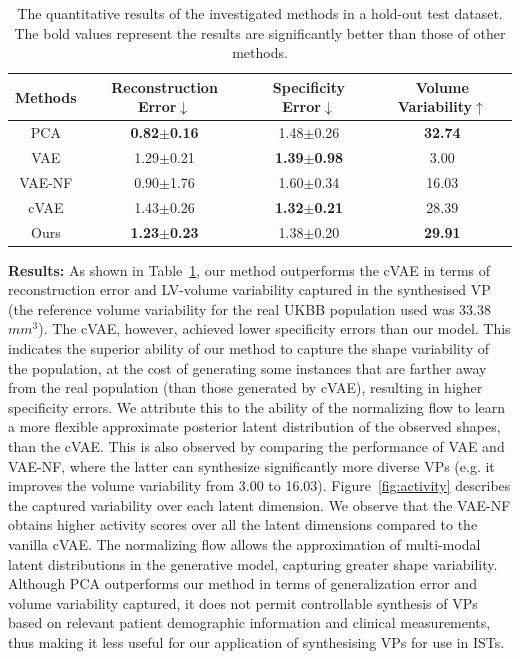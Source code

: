 \documentclass[runningheads]{llncs}
\begin{document}
\begin{table}[ht]
\centering
\caption{The quantitative results of the investigated methods in a hold-out test dataset. The bold values represent the results are significantly better than those of other methods.}
\label{tab:quantitative}
\begin{tabular}{c|c|c|c}
\hline
\hline
Methods &Reconstruction Error$\downarrow$ &Specificity Error$\downarrow$ &Volume Variability$\uparrow$ \\
\hline
PCA  & \textbf{0.82$\pm$0.16} &1.48$\pm$0.26  &\textbf{32.74}        \\
VAE  & 1.29$\pm$0.21 &\textbf{1.39$\pm$0.98}  &3.00         \\
VAE-NF &0.90$\pm$1.76&1.60$\pm$0.34  &16.03           \\
\hline
cVAE &1.43$\pm$0.26 &\textbf{1.32$\pm$0.21} &28.39      \\
Ours &\textbf{1.23$\pm$0.23} &1.38$\pm$0.20 &\textbf{29.91}      \\
\hline
\hline
\end{tabular}
\end{table}
\textbf{Results:} As shown in Table~\ref{tab:quantitative}, our method outperforms the cVAE in terms of reconstruction error and LV-volume variability captured in the synthesised VP (the reference volume variability for the real UKBB population used was 33.38$mm^3$). The cVAE, however, achieved lower specificity errors than our model. This indicates the superior ability of our method to capture the shape variability of the population, at the cost of generating some instances that are farther away from the real population (than those generated by cVAE), resulting in higher specificity errors. We attribute this to the ability of the normalizing flow to learn a more flexible approximate posterior latent distribution of the observed shapes, than the cVAE. This is also observed by comparing the performance of VAE and VAE-NF, where the latter can synthesize significantly more diverse VPs (e.g. it improves the volume variability from 3.00 to 16.03). Figure~\ref{fig:activity} describes the captured variability over each latent dimension. We observe that the VAE-NF obtains higher activity scores over all the latent dimensions compared to the vanilla cVAE. The normalizing flow allows the approximation of multi-modal latent distributions in the generative model, capturing greater shape variability. Although PCA outperforms our method in terms of generalization error and volume variability captured, it does not permit controllable synthesis of VPs based on relevant patient demographic information and clinical measurements, thus making it less useful for our application of synthesising VPs for use in ISTs.
\end{document}
